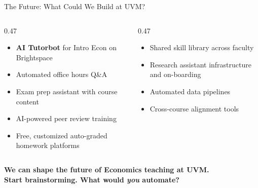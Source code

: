 \documentclass[aspectratio=169, 10pt]{beamer}
\begin{document}
\begin{frame}{The Future: What Could We Build at UVM?}
\begin{columns}[T]
\begin{column}{0.47\textwidth}
\begin{tcolorbox}[keybox, title={\faGraduationCap\quad Teaching}]
\small
\begin{itemize}\setlength{\itemsep}{1pt}
  \item \textbf{AI Tutorbot} for Intro Econ on Brightspace
  \item Automated office hours Q\&A
  \item Exam prep assistant with course content
  \item AI-powered peer review training
  \item Free, customized auto-graded homework platforms
\end{itemize}
\end{tcolorbox}
\end{column}
\begin{column}{0.47\textwidth}
\begin{tcolorbox}[keybox, title={\faUniversity\quad Department-Wide}]
\small
\begin{itemize}\setlength{\itemsep}{1pt}
  \item Shared skill library across faculty
  \item Research assistant infrastructure and on-boarding
  \item Automated data pipelines
  \item Cross-course alignment tools
\end{itemize}
\end{tcolorbox}
\end{column}
\end{columns}
\vskip6pt
\pause
\begin{tcolorbox}[accentbox, halign=center, width=11cm, top=3pt, bottom=3pt]
\small\bfseries We can shape the future of Economics teaching at UVM.\\[1pt]
\normalfont\small Start brainstorming. What would \textit{you} automate?
\end{tcolorbox}
\end{frame}
\end{document}
